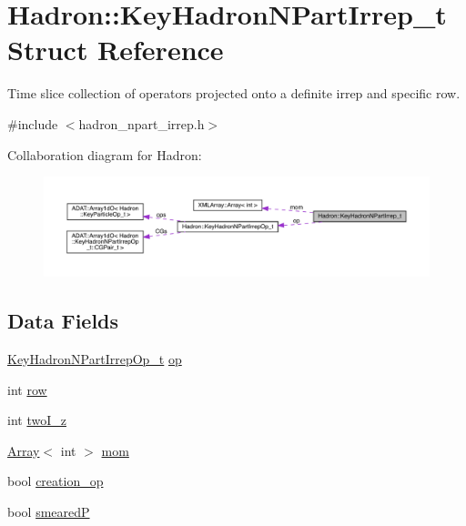 \hypertarget{structHadron_1_1KeyHadronNPartIrrep__t}{}\section{Hadron\+:\+:Key\+Hadron\+N\+Part\+Irrep\+\_\+t Struct Reference}
\label{structHadron_1_1KeyHadronNPartIrrep__t}


Time slice collection of operators projected onto a definite irrep and specific row.  




{\ttfamily \#include $<$hadron\+\_\+npart\+\_\+irrep.\+h$>$}



Collaboration diagram for Hadron\+:\nopagebreak
\begin{figure}[H]
\begin{center}
\leavevmode
\includegraphics[width=350pt]{d0/d6c/structHadron_1_1KeyHadronNPartIrrep__t__coll__graph}
\end{center}
\end{figure}
\subsection*{Data Fields}
\begin{DoxyCompactItemize}
\item 
\mbox{\hyperlink{structHadron_1_1KeyHadronNPartIrrepOp__t}{Key\+Hadron\+N\+Part\+Irrep\+Op\+\_\+t}} \mbox{\hyperlink{structHadron_1_1KeyHadronNPartIrrep__t_ab0dc5eaef88fc3a8149bcabffea44212}{op}}
\item 
int \mbox{\hyperlink{structHadron_1_1KeyHadronNPartIrrep__t_ac3322541750f4854d3af8e39c40148f0}{row}}
\item 
int \mbox{\hyperlink{structHadron_1_1KeyHadronNPartIrrep__t_ad84ecd917052923a7f2c690ab2730dfa}{two\+I\+\_\+z}}
\item 
\mbox{\hyperlink{classXMLArray_1_1Array}{Array}}$<$ int $>$ \mbox{\hyperlink{structHadron_1_1KeyHadronNPartIrrep__t_a4889bc591015cf78026b943bce731f34}{mom}}
\item 
bool \mbox{\hyperlink{structHadron_1_1KeyHadronNPartIrrep__t_aa0e6dbc61ba14fdacef1be61ce5971b2}{creation\+\_\+op}}
\item 
bool \mbox{\hyperlink{structHadron_1_1KeyHadronNPartIrrep__t_adc168c5e032072a880936aefb45a3e1e}{smearedP}}
\end{DoxyCompactItemize}


